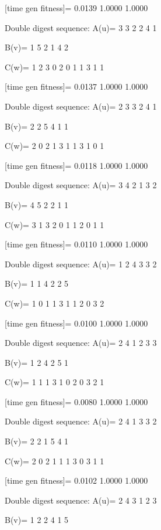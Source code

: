 [time gen fitness]=
    0.0139    1.0000    1.0000

Double digest sequence:
A(u)=
     3     3     2     2     4     1

B(v)=
     1     5     2     1     4     2

C(w)=
     1     2     3     0     2     0     1     1     3     1     1

[time gen fitness]=
    0.0137    1.0000    1.0000

Double digest sequence:
A(u)=
     2     3     3     2     4     1

B(v)=
     2     2     5     4     1     1

C(w)=
     2     0     2     1     3     1     1     3     1     0     1

[time gen fitness]=
    0.0118    1.0000    1.0000

Double digest sequence:
A(u)=
     3     4     2     1     3     2

B(v)=
     4     5     2     2     1     1

C(w)=
     3     1     3     2     0     1     1     2     0     1     1

[time gen fitness]=
    0.0110    1.0000    1.0000

Double digest sequence:
A(u)=
     1     2     4     3     3     2

B(v)=
     1     1     4     2     2     5

C(w)=
     1     0     1     1     3     1     1     2     0     3     2

[time gen fitness]=
    0.0100    1.0000    1.0000

Double digest sequence:
A(u)=
     2     4     1     2     3     3

B(v)=
     1     2     4     2     5     1

C(w)=
     1     1     1     3     1     0     2     0     3     2     1

[time gen fitness]=
    0.0080    1.0000    1.0000

Double digest sequence:
A(u)=
     2     4     1     3     3     2

B(v)=
     2     2     1     5     4     1

C(w)=
     2     0     2     1     1     1     3     0     3     1     1

[time gen fitness]=
    0.0102    1.0000    1.0000

Double digest sequence:
A(u)=
     2     4     3     1     2     3

B(v)=
     1     2     2     4     1     5

